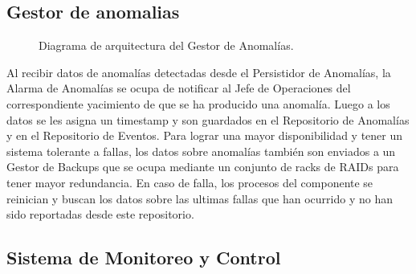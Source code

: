 \documentclass{article}
\theoremstyle{definition}
\theoremstyle{remark}
\begin{document}
\subsection{Gestor de anomalias} \label{gestor_anomalias}

\begin{figure}[H]
  \caption{Diagrama de arquitectura del Gestor de Anomalías.}
\end{figure}

Al recibir datos de anomalías detectadas desde el Persistidor de Anomalías, la Alarma de Anomalías se ocupa de notificar al Jefe de Operaciones del correspondiente yacimiento de que se ha producido una anomalía. Luego a los datos se les asigna un timestamp y son guardados en el Repositorio de Anomalías y en el Repositorio de Eventos. Para lograr una mayor disponibilidad y tener un sistema tolerante a fallas, los datos sobre anomalías también son enviados a un Gestor de Backups que se ocupa mediante un conjunto de racks de RAIDs para tener mayor redundancia. En caso de falla, los procesos del componente se reinician y buscan los datos sobre las ultimas fallas que han ocurrido y no han sido reportadas desde este repositorio.

\subsection{Sistema de Monitoreo y Control} \label{monitoreo_y_control}
\end{document}

